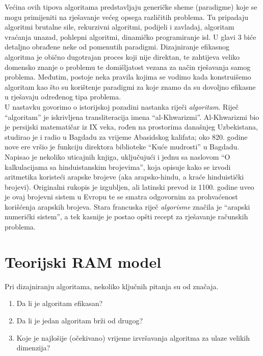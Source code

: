  Većina ovih tipova algoritama predstavljaju generičke sheme (paradigme) koje se mogu primijeniti na  rješavanje većeg opsega različitih problema. Tu pripadaju algoritmi brutalne sile, rekurzivni algoritmi, podijeli i zavladaj, algoritam vraćanja unazad, pohlepni algoritmi, dinamičko programiranje isl. U glavi 3 biće detaljno obrađene  neke od pomenutih paradigmi.   Dizajni\-ranje efikasnog algoritma je obično dugotrajan proces koji nije direktan, te zahtijeva veliko domensko znanje o problemu te domišljatost vezana za način rješavanja samog  problema.  Međutim, postoje neka pravila kojima se vodimo kada konstruišemo algoritam kao što su korištenje paradigmi za koje znamo da su dovoljno efikasne u rješavaju određenog tipa problema. 
 \\ 
 
 U nastavku govorimo o istorijskoj pozadini nastanka riječi \textit{algoritam}. Riječ ``algoritam'' je iskrivljena transliteracija imena ``al-Khwarizmi''. Al-Khwarizmi bio je persijski matematičar iz IX veka, rođen na prostorima današnjeg Uzbekistana, studirao je i radio u Bagdadu za vrijeme Abasidskog kalifata; oko 820. godine nove ere vršio je funkciju 
  direktora biblioteke ``Kuće mudrosti'' u Bagdadu. Napisao je nekoliko
 uticajnih knjiga, uključuju\-ći i jednu sa naslovom ``O kalkulacijama sa hinduistanskim brojevima'', koja opisuje kako se izvodi aritmetika koristeći arapske brojeve (aka arapsko-hindu, a kraće hinduistički brojevi). Originalni rukopis je izgubljen, ali latinski prevod iz 
 1100. godine uveo je ovaj brojevni sistem u Evropu te se smatra odgovornim  za prohvaćenost korišćenja  arapskih brojeva.   Stara francuska riječ \textit{algorisme} značila je
 ``arapski numerički sistem'', a tek kasnije je postao opšti recept za rješavanje računskih problema.

\section{Teorijski RAM model}

Pri dizajniranju  algoritama, nekoliko ključnih pitanja su od značaja.  
\begin{enumerate}
	\item Da li je algoritam efikasan? 
	\item Da li je jedan algoritam brži od drugog? 
	\item Koje je najlošije (očekivano) vrijeme izvršavanja algoritma za ulaze velikih dimenzija? 
\end{enumerate}
 

